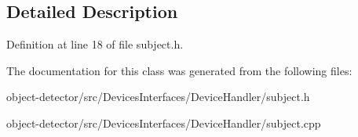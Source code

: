 \subsection{Detailed Description}


Definition at line 18 of file subject.\+h.



The documentation for this class was generated from the following files\+:\begin{DoxyCompactItemize}
\item 
object-\/detector/src/\+Devices\+Interfaces/\+Device\+Handler/subject.\+h\item 
object-\/detector/src/\+Devices\+Interfaces/\+Device\+Handler/subject.\+cpp\end{DoxyCompactItemize}
